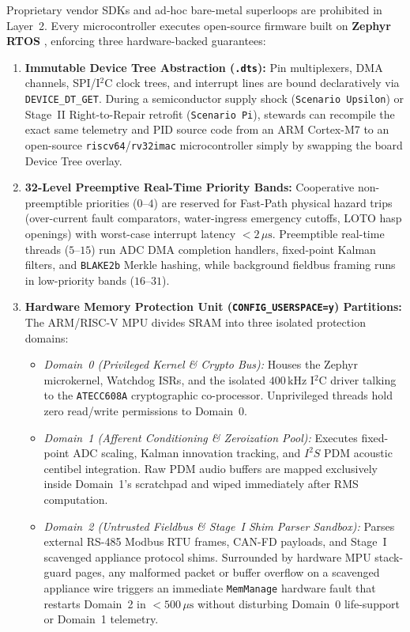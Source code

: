 Proprietary vendor SDKs and ad-hoc bare-metal superloops are prohibited in Layer~2. Every microcontroller executes open-source firmware built on \textbf{Zephyr RTOS} \parencite{zephyr2024}, enforcing three hardware-backed guarantees:
\begin{enumerate}
    \item \textbf{Immutable Device Tree Abstraction (\texttt{.dts}):} Pin multiplexers, DMA channels, SPI/I$^2$C clock trees, and interrupt lines are bound declaratively via \texttt{DEVICE\_DT\_GET}. During a semiconductor supply shock (\texttt{Scenario Upsilon}) or Stage~II Right-to-Repair retrofit (\texttt{Scenario Pi}), stewards can recompile the exact same telemetry and PID source code from an ARM Cortex-M7 to an open-source \texttt{riscv64}/\texttt{rv32imac} microcontroller simply by swapping the board Device Tree overlay.
    \item \textbf{32-Level Preemptive Real-Time Priority Bands:} Cooperative non-preemptible priorities ($0\text{--}4$) are reserved for Fast-Path physical hazard trips (over-current fault comparators, water-ingress emergency cutoffs, LOTO hasp openings) with worst-case interrupt latency $< 2\,\mu\mathrm{s}$. Preemptible real-time threads ($5\text{--}15$) run ADC DMA completion handlers, fixed-point Kalman filters, and \texttt{BLAKE2b} Merkle hashing, while background fieldbus framing runs in low-priority bands ($16\text{--}31$).
    \item \textbf{Hardware Memory Protection Unit (\texttt{CONFIG\_USERSPACE=y}) Partitions:} The ARM/RISC-V MPU divides SRAM into three isolated protection domains:
    \begin{itemize}
        \item \textit{Domain~0 (Privileged Kernel \& Crypto Bus):} Houses the Zephyr microkernel, Watchdog ISRs, and the isolated $400\,\mathrm{kHz}$ I$^2$C driver talking to the \texttt{ATECC608A} cryptographic co-processor. Unprivileged threads hold zero read/write permissions to Domain~0.
        \item \textit{Domain~1 (Afferent Conditioning \& Zeroization Pool):} Executes fixed-point ADC scaling, Kalman innovation tracking, and $I^2S$ PDM acoustic centibel integration. Raw PDM audio buffers are mapped exclusively inside Domain~1's scratchpad and wiped immediately after RMS computation.
        \item \textit{Domain~2 (Untrusted Fieldbus \& Stage~I Shim Parser Sandbox):} Parses external RS-485 Modbus RTU frames, CAN-FD payloads, and Stage~I scavenged appliance protocol shims. Surrounded by hardware MPU stack-guard pages, any malformed packet or buffer overflow on a scavenged appliance wire triggers an immediate \texttt{MemManage} hardware fault that restarts Domain~2 in $< 500\,\mu\mathrm{s}$ without disturbing Domain~0 life-support or Domain~1 telemetry.
    \end{itemize}
\end{enumerate}

